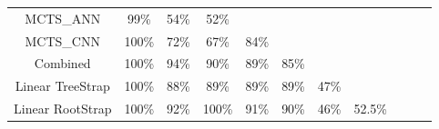 \documentclass[a4paper,12pt,table]{article}
\begin{document}
\begin{table}[H]
{\begin{tabular}{|c|cccccccccc}
    MCTS\_ANN      & \multicolumn{1}{c|}{99\%}                       & \multicolumn{1}{c|}{54\%}                       & \multicolumn{1}{c|}{52\%}                       & \cellcolor[HTML]{000000}{\color[HTML]{000000} } & \cellcolor[HTML]{000000}{\color[HTML]{000000} } & \cellcolor[HTML]{000000}{\color[HTML]{000000} } & \cellcolor[HTML]{000000}{\color[HTML]{000000} } & \cellcolor[HTML]{000000}{\color[HTML]{000000} } & \cellcolor[HTML]{000000}{\color[HTML]{000000} } & \cellcolor[HTML]{000000}{\color[HTML]{000000} } \\ \cline{1-5}
    MCTS\_CNN      & \multicolumn{1}{c|}{100\%}                      & \multicolumn{1}{c|}{72\%}                       & \multicolumn{1}{c|}{67\%}                       & \multicolumn{1}{c|}{84\%}                       & \cellcolor[HTML]{000000}                        & \cellcolor[HTML]{000000}                        & \cellcolor[HTML]{000000}                        & \cellcolor[HTML]{000000}                        & \cellcolor[HTML]{000000}                        & \cellcolor[HTML]{000000}                        \\ \cline{1-6}
    Combined        & \multicolumn{1}{c|}{100\%}                     & \multicolumn{1}{c|}{94\%}                       & \multicolumn{1}{c|}{90\%}                       & \multicolumn{1}{c|}{89\%}                       & \multicolumn{1}{c|}{85\%}                       & \cellcolor[HTML]{000000}                     & \cellcolor[HTML]{000000}                       & \cellcolor[HTML]{000000}                        & \cellcolor[HTML]{000000}                        & \cellcolor[HTML]{000000}                        \\ \cline{1-7}
    Linear TreeStrap & \multicolumn{1}{c|}{100\%}                    & \multicolumn{1}{c|}{88\%}                       & \multicolumn{1}{c|}{89\%}                       & \multicolumn{1}{c|}{89\%}                       & \multicolumn{1}{c|}{89\%}                       & \multicolumn{1}{c|}{47\%}                           & \cellcolor[HTML]{000000}                        & \cellcolor[HTML]{000000}                        & \cellcolor[HTML]{000000}                        & \cellcolor[HTML]{000000}                        \\ \cline{1-8}
    Linear RootStrap & \multicolumn{1}{c|}{100\%}                    & \multicolumn{1}{c|}{92\%}                       & \multicolumn{1}{c|}{100\%}                      & \multicolumn{1}{c|}{91\%}                       & \multicolumn{1}{c|}{90\%}                       & \multicolumn{1}{c|}{46\%}                           & \multicolumn{1}{c|}{52.5\%}                           & \cellcolor[HTML]{000000}                        & \cellcolor[HTML]{000000}                        & \cellcolor[HTML]{000000}                        \\ \cline{1-9}

\end{tabular}}
\end{table}
\end{document}
